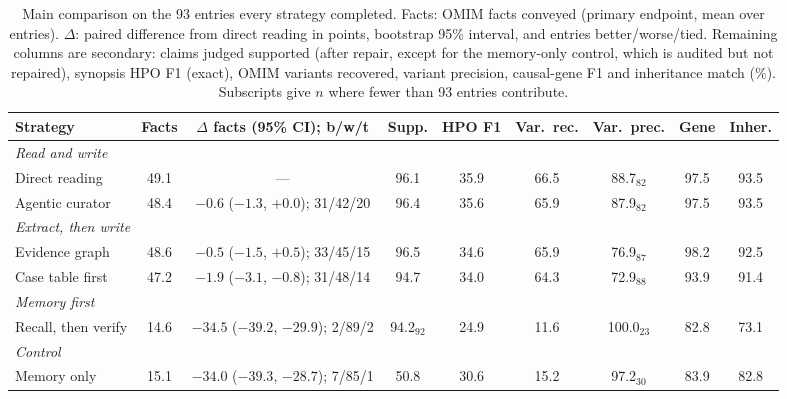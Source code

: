 \documentclass{article} %
\begin{document}
\begin{table}[t]
\caption{Main comparison on the 93 entries every strategy completed. Facts: OMIM facts conveyed (primary endpoint, mean over entries). $\Delta$: paired difference from direct reading in points, bootstrap 95\% interval, and entries better/worse/tied. Remaining columns are secondary: claims judged supported (after repair, except for the memory-only control, which is audited but not repaired), synopsis HPO F1 (exact), OMIM variants recovered, variant precision, causal-gene F1 and inheritance match (\%). Subscripts give $n$ where fewer than 93 entries contribute.}
\label{tab:main}
\begin{center}
\footnotesize
\setlength{\tabcolsep}{2.2pt}
\begin{tabular}{lcccccccc}
\toprule
Strategy & Facts & $\Delta$ facts (95\% CI); b/w/t & Supp. & HPO F1 & Var.\ rec. & Var.\ prec. & Gene & Inher. \\
\midrule
\multicolumn{9}{l}{\emph{Read and write}} \\
Direct reading & 49.1 & --- & 96.1 & 35.9 & 66.5 & 88.7$_{82}$ & 97.5 & 93.5 \\
Agentic curator & 48.4 & $-0.6$ ($-1.3$, $+0.0$); 31/42/20 & 96.4 & 35.6 & 65.9 & 87.9$_{82}$ & 97.5 & 93.5 \\
\multicolumn{9}{l}{\emph{Extract, then write}} \\
Evidence graph & 48.6 & $-0.5$ ($-1.5$, $+0.5$); 33/45/15 & 96.5 & 34.6 & 65.9 & 76.9$_{87}$ & 98.2 & 92.5 \\
Case table first & 47.2 & $-1.9$ ($-3.1$, $-0.8$); 31/48/14 & 94.7 & 34.0 & 64.3 & 72.9$_{88}$ & 93.9 & 91.4 \\
\multicolumn{9}{l}{\emph{Memory first}} \\
Recall, then verify & 14.6 & $-34.5$ ($-39.2$, $-29.9$); 2/89/2 & 94.2$_{92}$ & 24.9 & 11.6 & 100.0$_{23}$ & 82.8 & 73.1 \\
\multicolumn{9}{l}{\emph{Control}} \\
Memory only & 15.1 & $-34.0$ ($-39.3$, $-28.7$); 7/85/1 & 50.8 & 30.6 & 15.2 & 97.2$_{30}$ & 83.9 & 82.8 \\
\bottomrule
\end{tabular}
\end{center}
\end{table}
\end{document}
